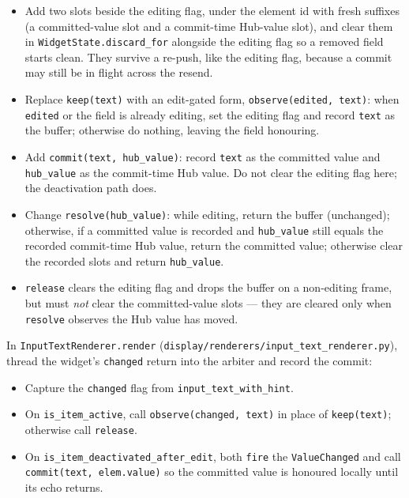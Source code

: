 \documentclass[a4paper,10pt,fleqn]{article}
\begin{document}
\begin{itemize}
  \item Add two slots beside the editing flag, under the element id with fresh
    suffixes (a committed-value slot and a commit-time Hub-value slot), and clear
    them in \texttt{WidgetState.discard\_for} alongside the editing flag so a
    removed field starts clean.  They survive a re-push, like the editing flag,
    because a commit may still be in flight across the resend.
  \item Replace \texttt{keep(text)} with an edit-gated form,
    \texttt{observe(edited, text)}: when \texttt{edited} or the field is already
    editing, set the editing flag and record \texttt{text} as the buffer;
    otherwise do nothing, leaving the field honouring.
  \item Add \texttt{commit(text, hub\_value)}: record \texttt{text} as the
    committed value and \texttt{hub\_value} as the commit-time Hub value.  Do not
    clear the editing flag here; the deactivation path does.
  \item Change \texttt{resolve(hub\_value)}: while editing, return the buffer
    (unchanged); otherwise, if a committed value is recorded and
    \texttt{hub\_value} still equals the recorded commit-time Hub value, return
    the committed value; otherwise clear the recorded slots and return
    \texttt{hub\_value}.
  \item \texttt{release} clears the editing flag and drops the buffer on a
    non-editing frame, but must \emph{not} clear the committed-value slots ---
    they are cleared only when \texttt{resolve} observes the Hub value has moved.
\end{itemize}

In \texttt{InputTextRenderer.render}
(\texttt{display/renderers/input\_text\_renderer.py}), thread the widget's
\texttt{changed} return into the arbiter and record the commit:

\begin{itemize}
  \item Capture the \texttt{changed} flag from \texttt{input\_text\_with\_hint}.
  \item On \texttt{is\_item\_active}, call \texttt{observe(changed, text)} in
    place of \texttt{keep(text)}; otherwise call \texttt{release}.
  \item On \texttt{is\_item\_deactivated\_after\_edit}, both \texttt{fire} the
    \texttt{ValueChanged} and call \texttt{commit(text, elem.value)} so the
    committed value is honoured locally until its echo returns.
\end{itemize}
\end{document}
